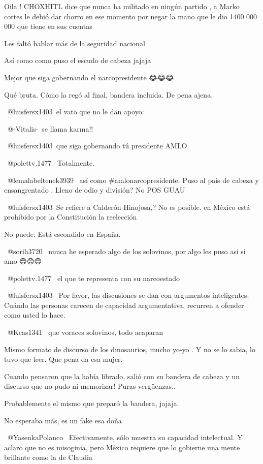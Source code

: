 Oila ! CHOXHITL dice que nunca ha militado en ningún partido , a Marko cortes le debió dar chorro en ese momento por negar la mano que le dio 1400 000 000 que tiene en sus cuentas

Les faltó hablar más de la seguridad nacional

Así como como puso el escudo de cabeza jajaja

Mejor que siga gobernando el narcopresidente 😂😂😂

Qué bruta. Cómo la regó al final, bandera incluida.
De pena ajena.

​ @luisfersx1403 el vato que no le dan apoyo:

​ @-Vitalis- se llama karma!!

​ @luisfersx1403 que siga gobernando tú presidente AMLO

 @polettv.1477  Totalmente.

​ @lemalabeltenek3939  así como #amlonarcopresidente.  Puso al país de cabeza y ensangrentado .
Lleno de odio y división?   No POS GUAU

​ @luisfersx1403 Se refiere a Calderón Hinojosa,? No es posible. en México está prohibido por la Constitución la reelección

No puede.   Está escondido en España.

 @sorih3720   nunca he esperado algo de los solovinos, por algo les puso asi si amo 😊😊😊

 @polettv.1477  el que te representa con su narcoestado 🤗😘

 @luisfersx1403  Por favor, las discusiones se dan  con argumentos inteligentes. 
Cuándo las personas carecen de capacidad argumentativa, recurren a ofender  como usted lo hace.

 @Kcas1341  que voraces  solovinos, todo acaparan 🤣🤣

Mismo formato de discurso de los dinosaurios, mucho yo-yo . Y no se lo sabia, lo tuvo que leer. Que pena da esa mujer.

Cuando pensaron que la había librado, salió con su bandera de cabeza y un discurso que no pudo ni memorizar! Puras vergüenzas..

Probablemente el mismo que preparó la bandera, jajaja.

No esperaba más, es un fake esa doña

 @YasenkaPolanco  Efectivamente, sólo  muestra su capacidad intelectual.  Y aclaro que  no es misoginia, pero México requiere que lo gobierne una mente brillante como  la de Claudia

